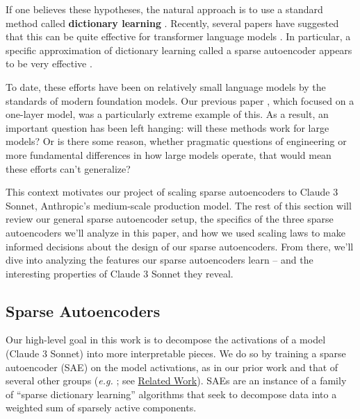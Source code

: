 \documentclass{article}
\let\oldsubsection\subsection
\renewcommand{\subsection}{\FloatBarrier\oldsubsection}
\begin{document}
If one believes these hypotheses, the natural approach is to use a standard method called \textbf{dictionary learning} \cite{elad2010sparse,olshausen1997sparse}. Recently, several papers have suggested that this can be quite effective for transformer language models \cite{yun2021transformer,bricken2023monosemanticity,cunningham2023sparse,tamkin2023codebook}. In particular, a specific approximation of dictionary learning called a sparse autoencoder appears to be very effective \cite{bricken2023monosemanticity,cunningham2023sparse}.

To date, these efforts have been on relatively small language models by the standards of modern foundation models. Our previous paper \cite{bricken2023monosemanticity}, which focused on a one-layer model, was a particularly extreme example of this. As a result, an important question has been left hanging: will these methods work for large models? Or is there some reason, whether pragmatic questions of engineering or more fundamental differences in how large models operate, that would mean these efforts can't generalize?

This context motivates our project of scaling sparse autoencoders to Claude 3 Sonnet, Anthropic's medium-scale production model. The rest of this section will review our general sparse autoencoder setup, the specifics of the three sparse autoencoders we'll analyze in this paper, and how we used scaling laws to make informed decisions about the design of our sparse autoencoders. From there, we'll dive into analyzing the features our sparse autoencoders learn -- and the interesting properties of Claude 3 Sonnet they reveal.

\subsection{Sparse Autoencoders}\label{sec:scaling-sparse-autoencoders}

Our high-level goal in this work is to decompose the activations of a model (Claude 3 Sonnet) into more interpretable pieces. We do so by training a sparse autoencoder (SAE) on the model activations, as in our prior work \cite{bricken2023monosemanticity} and that of several other groups (\textit{e.g.} \cite{yun2021transformer,cunningham2023sparse,tamkin2023codebook}; see \hyperref[sec:related-work]{Related Work}). SAEs are an instance of a family of “sparse dictionary learning” algorithms that seek to decompose data into a weighted sum of sparsely active components.
\end{document}
